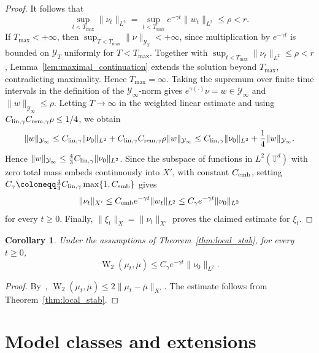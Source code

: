 \documentclass[11pt]{article}
\numberwithin{equation}{section}
\newtheorem{corollary}[theorem]{Corollary}
\theoremstyle{definition}
\newcommand{\T}{\mathbb{T}}
\newcommand{\Wtwo}{\operatorname{W}_2}
\begin{document}
\begin{proof}
    It follows that
    \[
    \sup_{t < T_{\max}} \|\nu_t\|_{L^2} = \sup_{t < T_{\max}} e^{-\gamma t} \|w_t\|_{L^2} \le \rho < r.
    \]
    If $T_{\max} < +\infty$, then $\sup_{T < T_{\max}} \|\nu\|_{\mathcal{Y}_T} < +\infty$, since multiplication by $e^{-\gamma t}$ is bounded on $\mathcal{Y}_T$ uniformly for $T < T_{\max}$. 
    Together with $\sup_{t < T_{\max}} \|\nu_t\|_{L^2} \le \rho < r$, Lemma~\ref{lem:maximal_continuation} extends the solution beyond $T_{\max}$, contradicting maximality. 
    Hence $T_{\max} = \infty$.
    Taking the supremum over finite time intervals in the definition of the $\mathcal{Y}_\infty$-norm gives $e^{\gamma(\cdot)}\nu = w \in \mathcal{Y}_\infty$ and $\|w\|_{\mathcal{Y}_\infty} \le \rho$.
    Letting $T \to \infty$ in the weighted linear estimate and using $C_{\rm lin,\gamma} C_{\rm rem,\gamma} \rho \le 1/4$, we obtain
    \[
    \|w\|_{\mathcal{Y}_\infty} \le C_{\rm lin,\gamma}\|\nu_0\|_{L^2} + C_{\rm lin,\gamma}C_{\rm rem,\gamma}\rho\|w\|_{\mathcal{Y}_\infty} \le C_{\rm lin,\gamma}\|\nu_0\|_{L^2} + \frac{1}{4}\|w\|_{\mathcal{Y}_\infty}.
    \]
    Hence $\|w\|_{\mathcal{Y}_\infty} \le \frac{4}{3} C_{\rm lin,\gamma}\|\nu_0\|_{L^2}$.
    Since the subspace of functions in $L^2(\T^d)$ with zero total mass embeds continuously into $X'$, with constant $C_{\rm emb}$, setting $C_\gamma \coloneqq \frac{4}{3} C_{\rm lin,\gamma}\max\{1, C_{\rm emb}\}$ gives
    \[
    \|\nu_t\|_{X'} \le C_{\rm emb} e^{-\gamma t}\|w_t\|_{L^2} \le C_\gamma e^{-\gamma t}\|\nu_0\|_{L^2}
    \]
    for every $t \ge 0$.
    Finally, $\|\xi_t\|_X = \|\nu_t\|_{X'}$ proves the claimed estimate for $\xi_t$.
\end{proof}

\begin{corollary}
\label{cor:local_w2_stabilization}
    Under the assumptions of Theorem~\ref{thm:local_stab}, for every $t \ge 0$,
    \[
    \Wtwo(\mu_t, \bar\mu) \le C_\gamma e^{-\gamma t} \|\nu_0\|_{L^2}.
    \]
\end{corollary}

\begin{proof}
    By~\cite[Thm.~1.1]{peyre2018comparison}, $\Wtwo(\mu_t, \bar\mu) \le 2\|\mu_t - \bar\mu\|_{X'}$.
    The estimate follows from Theorem~\ref{thm:local_stab}.
\end{proof}

\section{Model classes and extensions}
\label{sec:applications-numerics}
\end{document}
